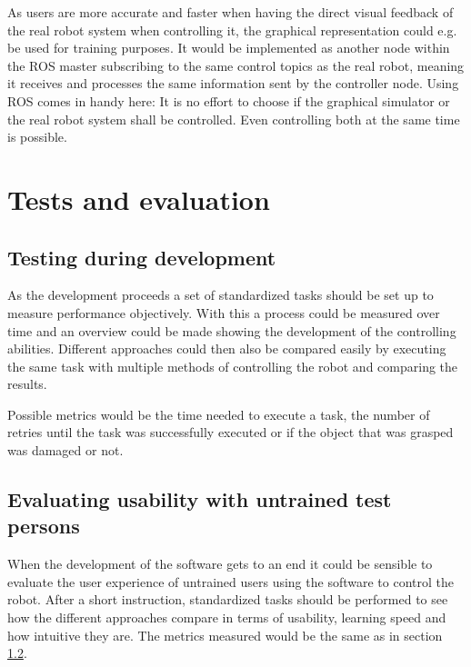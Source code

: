 \documentclass[a4paper]{article}
\begin{document}
As users are more accurate and faster when having the direct visual feedback of the real robot system when controlling it\cite{conf/humanoids/TohHLBZP12}, the graphical representation could e.g. be used for training purposes. It would be implemented as another node within the ROS master subscribing to the same control topics as the real robot, meaning it receives and processes the same information sent by the controller node. Using ROS comes in handy here: It is no effort to choose if the graphical simulator or the real robot system shall be controlled. Even controlling both at the same time is possible.

\section{Tests and evaluation}

\subsection{Testing during development}

As the development proceeds a set of standardized tasks should be set up to measure performance objectively. With this a process could be measured over time and an overview could be made showing the development of the controlling abilities. Different approaches could then also be compared easily by executing the same task with multiple methods of controlling the robot and comparing the results.

Possible metrics would be the time needed to execute a task, the number of retries until the task was successfully executed or if the object that was grasped was damaged or not.

\subsection{Evaluating usability with untrained test persons}
\label{sec:testdev}
When the development of the software gets to an end it could be sensible to evaluate the user experience of untrained users using the software to control the robot. After a short instruction, standardized tasks should be performed to see how the different approaches compare in terms of usability, learning speed and how intuitive they are. The metrics measured would be the same as in section \ref{sec:testdev}.

\pagebreak



\end{document}
